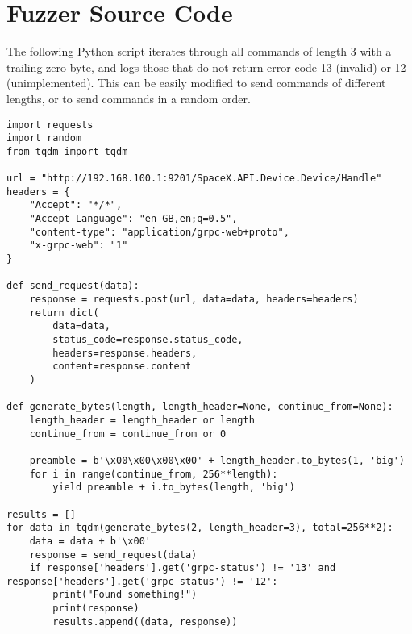 \section{Fuzzer Source Code}\label{app:fuzzer}

The following Python script iterates through all commands of length 3 with a trailing zero byte, and logs those that do not return error code 13 (invalid) or 12 (unimplemented). This can be easily modified to send commands of different lengths, or to send commands in a random order.

\begin{lstlisting}
import requests
import random
from tqdm import tqdm

url = "http://192.168.100.1:9201/SpaceX.API.Device.Device/Handle"
headers = {
    "Accept": "*/*",
    "Accept-Language": "en-GB,en;q=0.5",
    "content-type": "application/grpc-web+proto",
    "x-grpc-web": "1"
}

def send_request(data):
    response = requests.post(url, data=data, headers=headers)
    return dict(
        data=data,
        status_code=response.status_code,
        headers=response.headers,
        content=response.content
    )

def generate_bytes(length, length_header=None, continue_from=None):
    length_header = length_header or length
    continue_from = continue_from or 0

    preamble = b'\x00\x00\x00\x00' + length_header.to_bytes(1, 'big')
    for i in range(continue_from, 256**length):
        yield preamble + i.to_bytes(length, 'big')

results = []
for data in tqdm(generate_bytes(2, length_header=3), total=256**2):
    data = data + b'\x00'
    response = send_request(data)
    if response['headers'].get('grpc-status') != '13' and response['headers'].get('grpc-status') != '12':
        print("Found something!")
        print(response)
        results.append((data, response))
\end{lstlisting}